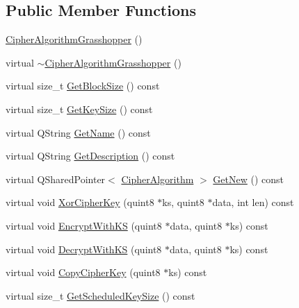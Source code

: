 \subsection*{Public Member Functions}
\begin{DoxyCompactItemize}
\item 
\hyperlink{class_gost_crypt_1_1_volume_1_1_cipher_algorithm_grasshopper_a61607bd99abc6ad00cb4a92f73301aee}{Cipher\+Algorithm\+Grasshopper} ()
\item 
virtual \hyperlink{class_gost_crypt_1_1_volume_1_1_cipher_algorithm_grasshopper_a193c17e7764767788d52b4c4473f0e6a}{$\sim$\+Cipher\+Algorithm\+Grasshopper} ()
\item 
virtual size\+\_\+t \hyperlink{class_gost_crypt_1_1_volume_1_1_cipher_algorithm_grasshopper_a31f8600b20a03dbb9b0b6715b38cd570}{Get\+Block\+Size} () const
\item 
virtual size\+\_\+t \hyperlink{class_gost_crypt_1_1_volume_1_1_cipher_algorithm_grasshopper_a8dc485167b00f29037cd9b68e3770e0e}{Get\+Key\+Size} () const
\item 
virtual Q\+String \hyperlink{class_gost_crypt_1_1_volume_1_1_cipher_algorithm_grasshopper_a9632d2781e6943683b02ff69766bef0e}{Get\+Name} () const
\item 
virtual Q\+String \hyperlink{class_gost_crypt_1_1_volume_1_1_cipher_algorithm_grasshopper_aa9f30f9dea6a68e76b8dbe6c961f2bbe}{Get\+Description} () const
\item 
virtual Q\+Shared\+Pointer$<$ \hyperlink{class_gost_crypt_1_1_volume_1_1_cipher_algorithm}{Cipher\+Algorithm} $>$ \hyperlink{class_gost_crypt_1_1_volume_1_1_cipher_algorithm_grasshopper_a6760e0603b5af70b2ff697831b1813d0}{Get\+New} () const
\item 
virtual void \hyperlink{class_gost_crypt_1_1_volume_1_1_cipher_algorithm_grasshopper_a282165ace19ed71c00dc92e33f0b3738}{Xor\+Cipher\+Key} (quint8 $\ast$ks, quint8 $\ast$data, int len) const
\item 
virtual void \hyperlink{class_gost_crypt_1_1_volume_1_1_cipher_algorithm_grasshopper_addae3b81a7a30d4379f1874ca694b0a8}{Encrypt\+With\+KS} (quint8 $\ast$data, quint8 $\ast$ks) const
\item 
virtual void \hyperlink{class_gost_crypt_1_1_volume_1_1_cipher_algorithm_grasshopper_a4a5845fc432ef4c16bf94b0c6d5973e2}{Decrypt\+With\+KS} (quint8 $\ast$data, quint8 $\ast$ks) const
\item 
virtual void \hyperlink{class_gost_crypt_1_1_volume_1_1_cipher_algorithm_grasshopper_afb28e10054150eec630294cd4eb5850c}{Copy\+Cipher\+Key} (quint8 $\ast$ks) const
\item 
virtual size\+\_\+t \hyperlink{class_gost_crypt_1_1_volume_1_1_cipher_algorithm_grasshopper_adcc6948022fd1274d9e16d99e5ee442d}{Get\+Scheduled\+Key\+Size} () const
\end{DoxyCompactItemize}
